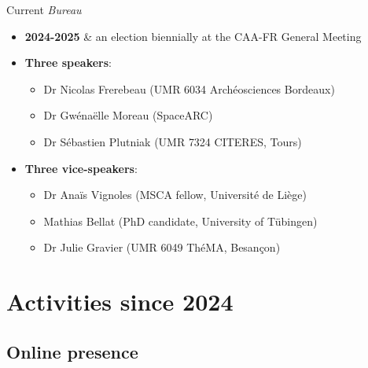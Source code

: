 \documentclass[xcolor=dvipsnames, 10pt, french, american]{beamer}
\begin{document}
\begin{frame}
    \begin{block}{Current \textit{Bureau}}
        \begin{itemize}
            \item \textbf{2024-2025} \& an election biennially at the CAA-FR General Meeting %
            \item \textbf{Three speakers}:
                \begin{itemize}
                    \item Dr Nicolas Frerebeau (UMR 6034 Archéosciences Bordeaux)
                    \item Dr Gwénaëlle Moreau (SpaceARC) %
                    \item Dr Sébastien Plutniak (UMR 7324 CITERES, Tours)
                \end{itemize}
            \item \textbf{Three vice-speakers}:
                \begin{itemize}
                    \item Dr Anaïs Vignoles (MSCA fellow, Université de Liège)
                    \item Mathias Bellat (PhD candidate, University of Tübingen) 
                    \item Dr Julie Gravier (UMR 6049 ThéMA, Besançon)
                \end{itemize}
        \end{itemize}
    \end{block}
\end{frame}


\section{Activities since 2024}
\frame{\tableofcontents[sectionstyle=show/shaded, subsectionstyle=show/hide/hide]}
 

\subsection{Online presence}
\frame{\tableofcontents[sectionstyle=show/shaded, subsectionstyle=show/shaded/hide]}
 
\end{document}
